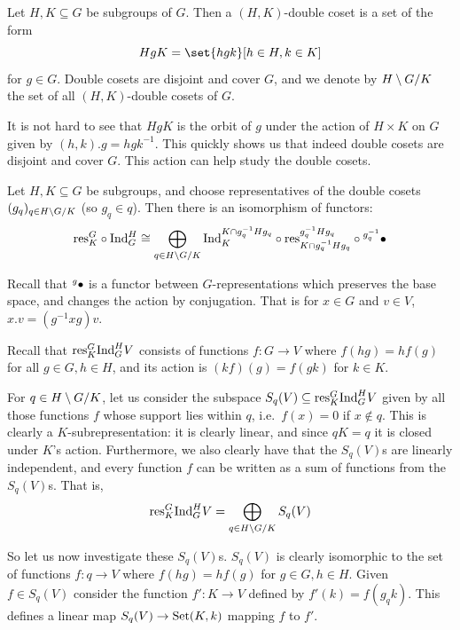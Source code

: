 \bdefn

    Let $H,K\subseteq G$ be subgroups of $G$.
    Then a {\emphcolor $(H,K)$-double coset} is a set of the form
    $$ HgK = \set{hgk}[h\in H,k\in K] $$
    for $g\in G$.
    Double cosets are disjoint and cover $G$, and we denote by $H\setminus G/K$ the set of all $(H,K)$-double cosets of $G$.

\edefn

It is not hard to see that $HgK$ is the orbit of $g$ under the action of $H\times K$ on $G$ given by $(h,k).g=hgk^{-1}$.
This quickly shows us that indeed double cosets are disjoint and cover $G$.
This action can help study the double cosets.

\bprop[title=Mackey]

    Let $H,K\subseteq G$ be subgroups, and choose representatives of the double cosets $(g_q)_{q\in H\setminus G/K}$ (so $g_q\in q$).
    Then there is an isomorphism of functors:
    $$ {\rm res}^G_K\circ{\rm Ind}^H_G \cong \bigoplus_{q\in H\setminus G/K}{\rm Ind}^{K\cap g_q^{-1}Hg_q}_K\circ{\rm res}^{g_q^{-1}Hg_q}_{K\cap g_q^{-1}Hg_q}\circ{}^{g_q^{-1}}\bullet $$

\eprop

Recall that ${}^g\bullet$ is a functor between $G$-representations which preserves the base space, and changes the action by conjugation.
That is for $x\in G$ and $v\in V$, $x.v=(g^{-1}xg)v$.

\bproof

    Recall that ${\rm res}^G_K{\rm Ind}^H_GV$ consists of functions $f\colon G\to V$ where $f(hg)=hf(g)$ for all $g\in G,h\in H$, and its action is $(kf)(g)=f(gk)$ for $k\in K$.

    For $q\in H\setminus G/K$, let us consider the subspace $S_q(V)\subseteq{\rm res}^G_K{\rm Ind}^H_GV$ given by all those functions $f$ whose support lies within $q$, i.e.\ $f(x)=0$ if $x\notin q$.
    This is clearly a $K$-subrepresentation: it is clearly linear, and since $qK=q$ it is closed under $K$'s action.
    Furthermore, we also clearly have that the $S_q(V)$s are linearly independent, and every function $f$ can be written as a sum of functions from the $S_q(V)$s.
    That is,
    $$ {\rm res}^G_K{\rm Ind}^H_GV = \bigoplus_{q\in H\setminus G/K}S_q(V) $$

    So let us now investigate these $S_q(V)$s.
    $S_q(V)$ is clearly isomorphic to the set of functions $f\colon q\to V$ where $f(hg)=hf(g)$ for $g\in G,h\in H$.
    Given $f\in S_q(V)$ consider the function $f'\colon K\to V$ defined by $f'(k)=f(g_qk)$.
    This defines a linear map $S_q(V)\to{\rm Set}(K,k)$ mapping $f$ to $f'$.

